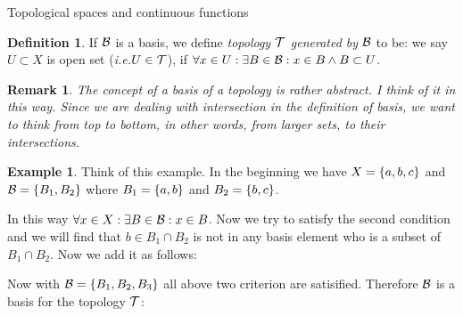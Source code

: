 \documentclass{report}
\newtheorem*{remark}{Remark}
\theoremstyle{definition}
\newtheorem{definition}[theorem]{Definition}
\newtheorem{example}[theorem]{Example}
\newcommand{\set}[1]{\ensuremath\{#1\}}
\newcommand{\ie}{\textit{i.e.}\xspace}
\newcommand{\ex}{\ensuremath\exists}
\begin{document}
\begin{chapter}{Topological spaces and continuous functions}
\begin{definition}
    If $\mathcal{B}$ is a basis, we define \emph{topology $\mathcal{T}$ generated by
      $\mathcal{B}$} to be: we say $U\subset X$ is open set (\ie $U\in\mathcal{T}$), if
    $\forall x\in U: \exists B\in\mathcal{B}: x\in B \land B\subset U$.
  \end{definition}
  \begin{remark}
    The concept of a basis of a topology is rather abstract. I think
    of it in this way. Since we are dealing with intersection in the
    definition of basis, we want to think from top to bottom, in other
    words, from larger sets, to their intersections.
  \end{remark}
  \begin{example}
    Think of this example. In the beginning we have $X=\set{a,b,c}$
    and ${\B=\set{B_1,B_2}}$ where $B_1=\set{a,b}$ and
    $B_2=\set{b,c}$.

    \begin{figure}[H]
      \centering
    \end{figure}

    In this way $\forall x\in X :\ex B\in \B: x\in B$. Now we try to
    satisfy the second condition and we will find that
    $b\in B_1\cap B_2$ is not in any basis element who is a subset of
    $B_1\cap B_2$. Now we add it as follows:

    \begin{figure}[H]
      \centering
    \end{figure}

    Now with $\B=\set{B_1,B_2,B_3}$ all above two criterion are
    satisified. Therefore $\mathcal{B}$ is a basis for the topology $\mathcal{T}$:

    \begin{figure}[H]
      \centering
    \end{figure}
  \end{example}


\end{chapter}
\end{document}
